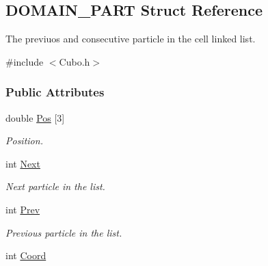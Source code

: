\hypertarget{structDOMAIN__PART}{}\subsection{D\+O\+M\+A\+I\+N\+\_\+\+P\+A\+RT Struct Reference}
\label{structDOMAIN__PART}


The previuos and consecutive particle in the cell linked list.  




{\ttfamily \#include $<$Cubo.\+h$>$}

\subsubsection*{Public Attributes}
\begin{DoxyCompactItemize}
\item 
double \hyperlink{structDOMAIN__PART_a863738e46f14b3bfc674ad87d35f143d}{Pos} \mbox{[}3\mbox{]}\hypertarget{structDOMAIN__PART_a863738e46f14b3bfc674ad87d35f143d}{}\label{structDOMAIN__PART_a863738e46f14b3bfc674ad87d35f143d}

\begin{DoxyCompactList}\small\item\em Position. \end{DoxyCompactList}\item 
int \hyperlink{structDOMAIN__PART_af494e3edb0fc7a8ffb49eb0fa81e3163}{Next}\hypertarget{structDOMAIN__PART_af494e3edb0fc7a8ffb49eb0fa81e3163}{}\label{structDOMAIN__PART_af494e3edb0fc7a8ffb49eb0fa81e3163}

\begin{DoxyCompactList}\small\item\em Next particle in the list. \end{DoxyCompactList}\item 
int \hyperlink{structDOMAIN__PART_a4b1223f434a5fe652ae0702f01801684}{Prev}\hypertarget{structDOMAIN__PART_a4b1223f434a5fe652ae0702f01801684}{}\label{structDOMAIN__PART_a4b1223f434a5fe652ae0702f01801684}

\begin{DoxyCompactList}\small\item\em Previous particle in the list. \end{DoxyCompactList}\item 
int \hyperlink{structDOMAIN__PART_ac78d2677b472306ff175386fdda521d5}{Coord}\hypertarget{structDOMAIN__PART_ac78d2677b472306ff175386fdda521d5}{}\label{structDOMAIN__PART_ac78d2677b472306ff175386fdda521d5}


\end{DoxyCompactItemize}
